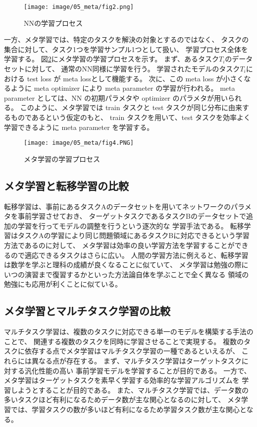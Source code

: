 \documentclass{jsarticle}
\begin{document}
\begin{figure}[H]
  \begin{center}
    \texttt{[image: image/05\_meta/fig2.png]}
    \caption{NNの学習プロセス\cite{meta-thomas}}
    \label{fig:fig2}
  \end{center}
\end{figure}

一方、メタ学習では、特定のタスクを解決の対象とするのではなく、
タスクの集合に対して、タスク1つを学習サンプル1つとして扱い、
学習プロセス全体を学習する。
図\ref{fig:fig4}\cite{meta-thomas}にメタ学習の学習プロセスを示す。
まず、あるタスク$T_i$のデータセットに対して、
通常のNN同様に学習を行う。
学習されたモデルのタスク$T_i$における test loss が meta lossとして機能する。
次に、この meta loss が小さくなるように meta optimizer により meta parameter の学習が行われる。
 meta parameter としては、NN の初期パラメタや optimizer のパラメタが用いられる。
このように、メタ学習では train タスクと test タスクが同じ分布に由来するものであるという仮定のもと、
 train タスクを用いて、test タスクを効率よく学習できるように
 meta parameter を学習する。

\begin{figure}[H]
  \begin{center}
    \texttt{[image: image/05\_meta/fig4.PNG]}
    \caption{メタ学習の学習プロセス\cite{meta-thomas}}
    \label{fig:fig4}
  \end{center}
\end{figure}

\subsection{メタ学習と転移学習の比較}
転移学習は、事前にあるタスクAのデータセットを用いてネットワークのパラメタを事前学習させておき、
ターゲットタスクであるタスクBのデータセットで追加の学習を行ってモデルの調整を行うという逐次的な
学習手法である。
転移学習はタスクAの学習により同じ問題領域にあるタスクBに対応できるという学習方法であるのに対して、
メタ学習は効率の良い学習方法を学習することができるので適応できるタスクはさらに広い。
人間の学習方法に例えると、転移学習は数学を学ぶと理科の成績が良くなることに似ていて、
メタ学習は勉強の際にいつの演習まで復習するかといった方法論自体を学ぶことで全く異なる
領域の勉強にも応用が利くことに似ている。

\subsection{メタ学習とマルチタスク学習の比較}
マルチタスク学習は、複数のタスクに対応できる単一のモデルを構築する手法のことで、
関連する複数のタスクを同時に学習させることで実現する。
複数のタスクに依存する点でメタ学習はマルチタスク学習の一種であるといえるが、
これらには異なる点が存在する。
まず、マルチタスク学習はターゲットタスクに対する汎化性能の高い
事前学習モデルを学習することが目的である。
一方で、メタ学習はターゲットタスクを素早く学習する効率的な学習アルゴリズムを
学習しようとすることが目的である。
また、マルチタスク学習では、データ数の多いタスクほど有利になるためデータ数が主な関心となるのに対して、
メタ学習では、学習タスクの数が多いほど有利になるため学習タスク数が主な関心となる。
\end{document}
